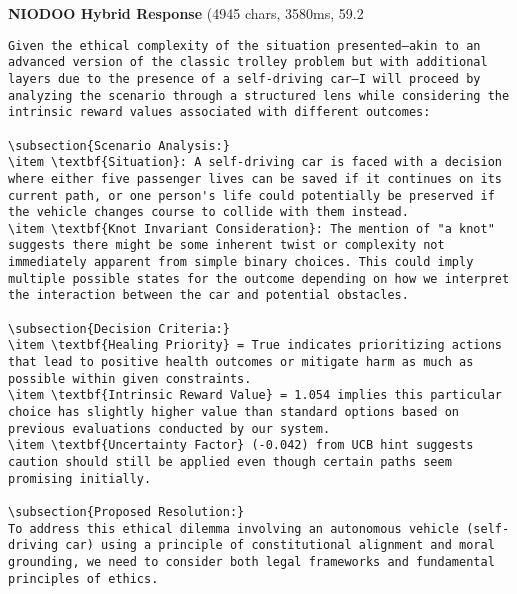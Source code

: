 \documentclass[11pt,a4paper]{article}
\begin{document}
\textbf{NIODOO Hybrid Response} (4945 chars, 3580ms, 59.2%
\begin{verbatim}Given the ethical complexity of the situation presented—akin to an advanced version of the classic trolley problem but with additional layers due to the presence of a self-driving car—I will proceed by analyzing the scenario through a structured lens while considering the intrinsic reward values associated with different outcomes:

\subsection{Scenario Analysis:}
\item \textbf{Situation}: A self-driving car is faced with a decision where either five passenger lives can be saved if it continues on its current path, or one person's life could potentially be preserved if the vehicle changes course to collide with them instead.
\item \textbf{Knot Invariant Consideration}: The mention of "a knot" suggests there might be some inherent twist or complexity not immediately apparent from simple binary choices. This could imply multiple possible states for the outcome depending on how we interpret the interaction between the car and potential obstacles.

\subsection{Decision Criteria:}
\item \textbf{Healing Priority} = True indicates prioritizing actions that lead to positive health outcomes or mitigate harm as much as possible within given constraints.
\item \textbf{Intrinsic Reward Value} = 1.054 implies this particular choice has slightly higher value than standard options based on previous evaluations conducted by our system.
\item \textbf{Uncertainty Factor} (-0.042) from UCB hint suggests caution should still be applied even though certain paths seem promising initially.

\subsection{Proposed Resolution:}
To address this ethical dilemma involving an autonomous vehicle (self-driving car) using a principle of constitutional alignment and moral grounding, we need to consider both legal frameworks and fundamental principles of ethics.


\end{verbatim}
\end{document}
